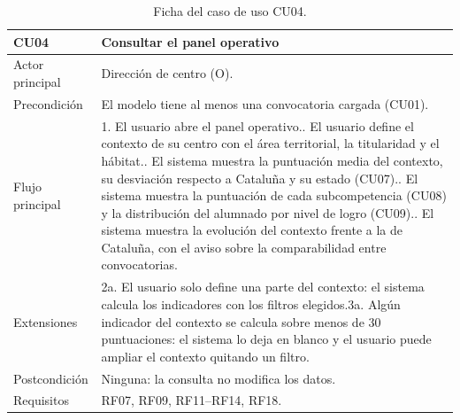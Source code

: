 \documentclass[12pt, a4paper, oneside]{report}
\begin{document}
\begin{table}[!tbp]
\centering
\small
{}\renewcommand{\arraystretch}{1.1}
\begin{tabularx}{\textwidth}{@{} >{\raggedright\arraybackslash}p{2.8cm} X @{}}
\toprule
\textbf{CU04} & \textbf{Consultar el panel operativo} \\ \midrule
Actor principal & Dirección de centro (O). \\ \addlinespace
Precondición & El modelo tiene al menos una convocatoria cargada (CU01). \\ \addlinespace
Flujo principal & 1. El usuario abre el panel operativo.\newline 2. El usuario define el contexto de su centro con el área territorial, la titularidad y el hábitat.\newline 3. El sistema muestra la puntuación media del contexto, su desviación respecto a Cataluña y su estado (CU07).\newline 4. El sistema muestra la puntuación de cada subcompetencia (CU08) y la distribución del alumnado por nivel de logro (CU09).\newline 5. El sistema muestra la evolución del contexto frente a la de Cataluña, con el aviso sobre la comparabilidad entre convocatorias. \\ \addlinespace
Extensiones & 2a. El usuario solo define una parte del contexto: el sistema calcula los indicadores con los filtros elegidos.\newline 3a. Algún indicador del contexto se calcula sobre menos de 30 puntuaciones: el sistema lo deja en blanco y el usuario puede ampliar el contexto quitando un filtro. \\ \addlinespace
Postcondición & Ninguna: la consulta no modifica los datos. \\ \addlinespace
Requisitos & RF07, RF09, RF11--RF14, RF18. \\ \bottomrule
\end{tabularx}
\caption{Ficha del caso de uso CU04.}
\label{tab:cu04}
\end{table}
\end{document}
